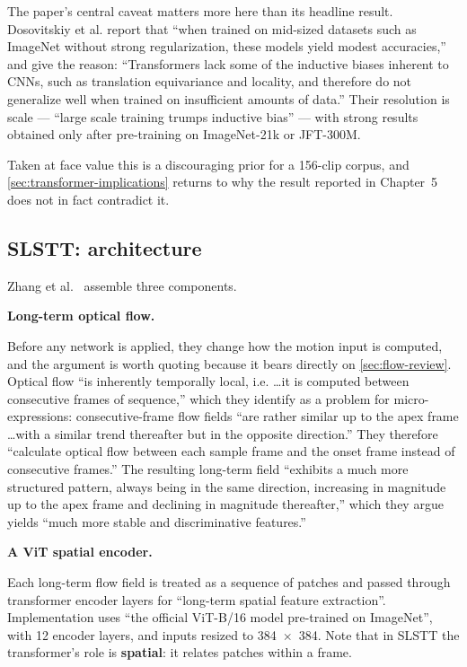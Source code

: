 The paper's central caveat matters more here than its headline result. Dosovitskiy et al. report that ``when trained on mid-sized datasets such as ImageNet without strong regularization, these models yield modest accuracies,'' and give the reason: ``Transformers lack some of the inductive biases inherent to CNNs, such as translation equivariance and locality, and therefore do not generalize well when trained on insufficient amounts of data.'' Their resolution is scale --- ``large scale training trumps inductive bias'' --- with strong results obtained only after pre-training on ImageNet-21k or JFT-300M.

Taken at face value this is a discouraging prior for a 156-clip corpus, and \autoref{sec:transformer-implications} returns to why the result reported in Chapter~5 does not in fact contradict it.

\subsection{SLSTT: architecture}
\label{sec:slstt-architecture}

Zhang et al.~\cite{zhang2022} assemble three components.

\textbf{Long-term optical flow.}

Before any network is applied, they change how the motion input is computed, and the argument is worth quoting because it bears directly on \autoref{sec:flow-review}. Optical flow ``is inherently temporally local, i.e. \ldots it is computed between consecutive frames of sequence,'' which they identify as a problem for micro-expressions: consecutive-frame flow fields ``are rather similar up to the apex frame \ldots with a similar trend thereafter but in the opposite direction.'' They therefore ``calculate optical flow between each sample frame and the onset frame instead of consecutive frames.'' The resulting long-term field ``exhibits a much more structured pattern, always being in the same direction, increasing in magnitude up to the apex frame and declining in magnitude thereafter,'' which they argue yields ``much more stable and discriminative features.''

\textbf{A ViT spatial encoder.}

Each long-term flow field is treated as a sequence of patches and passed through transformer encoder layers for ``long-term spatial feature extraction''. Implementation uses ``the official ViT-B/16 model pre-trained on ImageNet'', with 12 encoder layers, and inputs resized to 384~$\times$~384. Note that in SLSTT the transformer's role is \textbf{spatial}: it relates patches within a frame.

